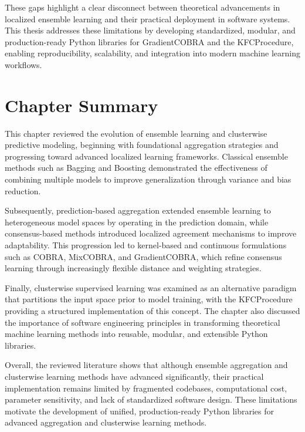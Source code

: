 These gaps highlight a clear disconnect between theoretical advancements in localized ensemble learning and their practical deployment in software systems. This thesis addresses these limitations by developing standardized, modular, and production-ready Python libraries for GradientCOBRA and the KFCProcedure, enabling reproducibility, scalability, and integration into modern machine learning workflows.


\section{Chapter Summary}

\hs This chapter reviewed the evolution of ensemble learning and clusterwise predictive modeling, beginning with foundational aggregation strategies and progressing toward advanced localized learning frameworks. Classical ensemble methods such as Bagging and Boosting demonstrated the effectiveness of combining multiple models to improve generalization through variance and bias reduction.

Subsequently, prediction-based aggregation extended ensemble learning to heterogeneous model spaces by operating in the prediction domain, while consensus-based methods introduced localized agreement mechanisms to improve adaptability. This progression led to kernel-based and continuous formulations such as COBRA, MixCOBRA, and GradientCOBRA, which refine consensus learning through increasingly flexible distance and weighting strategies.

Finally, clusterwise supervised learning was examined as an alternative paradigm that partitions the input space prior to model training, with the KFCProcedure providing a structured implementation of this concept. The chapter also discussed the importance of software engineering principles in transforming theoretical machine learning methods into reusable, modular, and extensible Python libraries.

Overall, the reviewed literature shows that although ensemble aggregation and clusterwise learning methods have advanced significantly, their practical implementation remains limited by fragmented codebases, computational cost, parameter sensitivity, and lack of standardized software design. These limitations motivate the development of unified, production-ready Python libraries for advanced aggregation and clusterwise learning methods.

